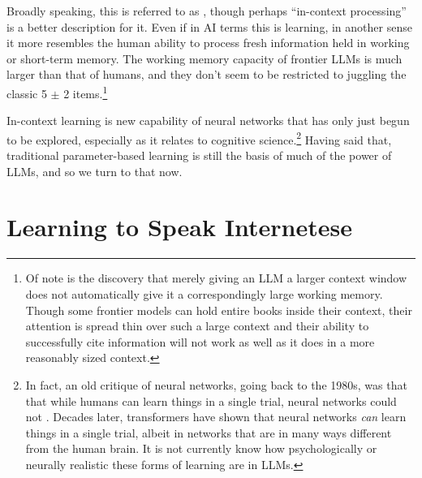 Broadly speaking, this is referred to as , though
perhaps ``in-context processing'' is a better description for it. Even if in AI
terms this is learning, in another sense it more resembles the human ability to
process fresh information held in working or short-term memory. The working
memory capacity of frontier LLMs is much larger than that of humans, and they
don't seem to be restricted to juggling the classic 5 $\pm$ 2
items.\footnote{Of note is the discovery that merely giving an LLM a larger
context window does not automatically give it a correspondingly large working
memory. Though some frontier models can hold entire books inside their context,
their attention is spread thin over such a large context and their ability to
successfully cite information will not work as well as it does in a more
reasonably sized context.}

In-context learning is new capability of neural networks that has only just begun to
be explored, especially as it relates to cognitive science.\footnote{In fact, an old critique of neural networks, going back to the 1980s, was that that while humans can learn things in a single trial, neural networks could not \cite{schneider1988structure}. Decades later, transformers have shown that neural networks \emph{can} learn things in a single trial, albeit in networks that are in many ways different from the human brain. It is not currently know how psychologically or neurally realistic these forms of learning are in LLMs.} Having said that,
traditional parameter-based learning is still the basis of much of the power of
LLMs, and so we turn to that now.

\section{Learning to Speak Internetese}\label{internetese}

